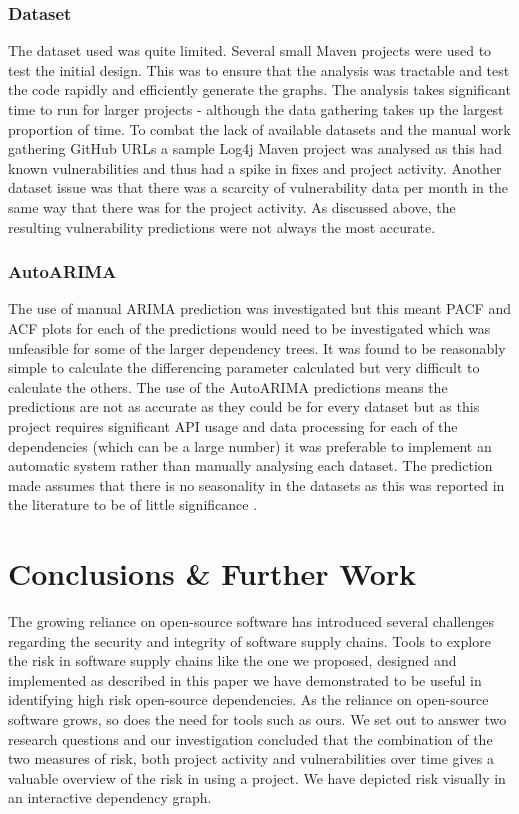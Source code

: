 \documentclass[conference]{IEEEtran}
\begin{document}
\subsubsection{Dataset}
The dataset used was quite limited. Several small Maven projects were used to test the initial design. This was to ensure that the analysis was tractable and test the code rapidly and efficiently generate the graphs. The analysis takes significant time to run for larger projects - although the data gathering takes up the largest proportion of time. To combat the lack of available datasets and the manual work gathering GitHub URLs a sample Log4j Maven project was analysed as this had known vulnerabilities and thus had a spike in fixes and project activity. Another dataset issue was that there was a scarcity of vulnerability data per month in the same way that there was for the project activity. As discussed above, the resulting vulnerability predictions were not always the most accurate. 

\subsubsection{AutoARIMA}
The use of manual ARIMA prediction was investigated but this meant PACF and ACF plots for each of the predictions would need to be investigated which was unfeasible for some of the larger dependency trees. It was found to be reasonably simple to calculate the differencing parameter calculated but very difficult to calculate the others. The use of the AutoARIMA predictions means the predictions are not as accurate as they could be for every dataset but as this project requires significant API usage and data processing for each of the dependencies (which can be a large number) it was preferable to implement an automatic system rather than manually analysing each dataset. The prediction made assumes that there is no seasonality in the datasets as this was reported in the literature to be of little significance \cite{roumani_time_2015}. 

\section{Conclusions \& Further Work}
The growing reliance on open-source software \cite{noauthor_cisa_2023} has introduced several challenges regarding the security and integrity of software supply chains. Tools to explore the risk in software supply chains like the one we proposed, designed and implemented as described in this paper we have demonstrated to be useful in identifying high risk open-source dependencies. As the reliance on open-source software grows, so does the need for tools such as ours. We set out to answer two research questions and our investigation concluded that the combination of the two measures of risk, both project activity and vulnerabilities over time gives a valuable overview of the risk in using a project. We have depicted risk visually in an interactive dependency graph. 
\end{document}
